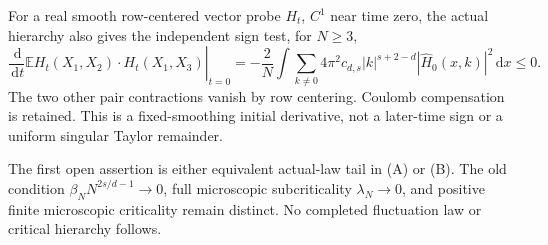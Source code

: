 \documentclass[10pt]{article}
\newcommand{\E}{\mathbb E}
\newcommand{\dd}{\,\mathrm d}
\begin{document}
For a real smooth row-centered vector probe $H_t$, $C^1$ near time zero,
the actual hierarchy also gives the independent sign test, for $N\ge3$,
\[
 \left.\frac{\dd}{\dd t}\E H_t(X_1,X_2)\cdot H_t(X_1,X_3)\right|_{t=0}
 =-\frac2N\int\sum_{k\ne0}4\pi^2c_{d,s}|k|^{s+2-d}
                          |\widehat H_0(x,k)|^2\dd x\le0.
\]
The two other pair contractions vanish by row centering. Coulomb
compensation is retained. This is a fixed-smoothing initial derivative,
not a later-time sign or a uniform singular Taylor remainder.

\medskip\noindent
The first open assertion is either equivalent actual-law tail in (A) or
(B). The old condition $\beta_NN^{2s/d-1}\to0$, full microscopic
subcriticality $\lambda_N\to0$, and positive finite microscopic criticality
remain distinct. No completed fluctuation law or critical hierarchy follows.
\end{document}
